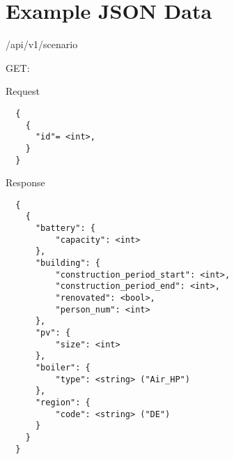 \clearpage %

\chapter{Example JSON Data}
\label{appendix:example_JSON}

/api/v1/scenario

GET:

Request 
\begin{verbatim}
  {
    {
      "id"= <int>,
    }
  }
\end{verbatim}
    
Response
\begin{verbatim}
  {
    {
      "battery": {
          "capacity": <int>
      }, 
      "building": {
          "construction_period_start": <int>, 
          "construction_period_end": <int>, 
          "renovated": <bool>, 
          "person_num": <int>
      }, 
      "pv": {
          "size": <int>
      }, 
      "boiler": {
          "type": <string> ("Air_HP")
      }, 
      "region": {
          "code": <string> ("DE")
      }
    }
  }
\end{verbatim}